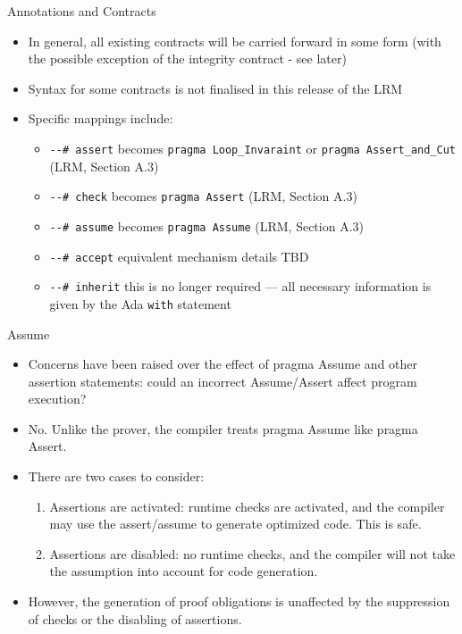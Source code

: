 \documentclass{beamer}
\begin{document}
\begin{frame}[fragile]{Annotations and Contracts}

  \begin{itemize}
  \item In general, all existing contracts will be carried forward in some form (with the possible exception of the integrity contract - see later)
  \item Syntax for some contracts is not finalised in this release of the LRM
  \item Specific mappings include:

    \begin{itemize}
    \item \verb|--# assert| becomes \verb|pragma Loop_Invaraint| or \verb|pragma Assert_and_Cut| (LRM, Section A.3)
    \item \verb|--# check| becomes \verb|pragma Assert| (LRM, Section A.3)
    \item \verb|--# assume| becomes \verb|pragma Assume| (LRM, Section A.3)
    \item \verb|--# accept| equivalent mechanism details TBD
    \item \verb|--# inherit| this is no longer required --- all necessary information is given by the Ada \verb|with| statement 
    \end{itemize}

  \end{itemize}

\end{frame}

\begin{frame}{Assume}

  \begin{itemize}

  \item Concerns have been raised over the effect of pragma Assume and other assertion statements: could an incorrect Assume/Assert affect program execution?

  \item No. Unlike the prover, the compiler treats pragma Assume like pragma Assert.

  \item There are two cases to consider:
  \begin{enumerate}
    \item Assertions are activated: runtime checks are activated, and the compiler may use the assert/assume to generate optimized code. This is safe.
    \item Assertions are disabled: no runtime checks, and the compiler will not take the assumption into account for code generation.
  \end{enumerate}

  \item However, the generation of proof obligations is unaffected by the suppression of checks or the disabling of assertions.

  \end{itemize}

\end{frame}
\end{document}
